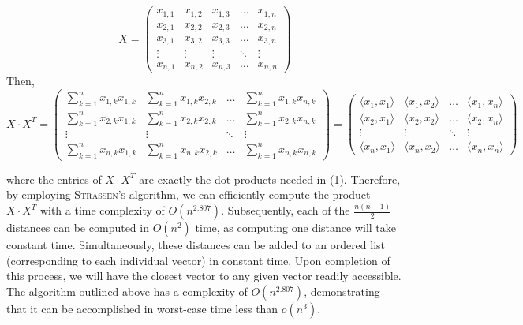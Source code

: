 \documentclass[12pt]{article}
\theoremstyle{definition}
\theoremstyle{remark}
\begin{document}
\begin{enumerate}
  $$ X = \begin{pmatrix}
    x_{1,1} & x_{1,2} & x_{1,3} & \hdots & x_{1,n} \\ 
 x_{2,1} & x_{2,2} & x_{2,3} & \hdots & x_{2,n} \\
 x_{3,1} & x_{3,2} & x_{3,3} & \hdots & x_{3,n}\\ 
    \vdots & \vdots & \vdots & \ddots & \vdots \\ 
     x_{n,1} & x_{n,2} & x_{n,3} & \hdots & x_{n,n}
  \end{pmatrix} $$
  Then, 
  $$X \cdot X^T = \begin{pmatrix}
    \sum_{k = 1}^n x_{1,k}x_{1,k} & \sum_{k = 1}^n x_{1,k}x_{2,k} & \hdots  & \sum_{k = 1}^n x_{1,k}x_{n,k} \\ 
    \sum_{k = 1}^n x_{2,k}x_{1,k} & \sum_{k = 1}^n x_{2,k}x_{2,k} & \hdots  & \sum_{k = 1}^n x_{2,k}x_{n,k} \\ 
\vdots & \vdots & \ddots & \vdots \\ 
    \sum_{k = 1}^n x_{n,k}x_{1,k} & \sum_{k = 1}^n x_{n,k}x_{2,k} & \hdots  & \sum_{k = 1}^n x_{n,k}x_{n,k}
  \end{pmatrix} = \begin{pmatrix}
    \langle x_1, x_1  \rangle &\langle x_1, x_2  \rangle & \hdots & \langle x_1, x_n  \rangle \\ 
\langle x_2, x_1  \rangle &\langle x_2, x_2  \rangle & \hdots & \langle x_2, x_n  \rangle \\ 
\vdots & \vdots & \ddots & \vdots \\ 

\langle x_n, x_1  \rangle &\langle x_n, x_2  \rangle & \hdots & \langle x_n, x_n  \rangle  

  \end{pmatrix}  $$

where the entries of $X \cdot {X^T}$ are exactly the dot products needed in (1). 
Therefore, by employing \textsc{Strassen's} algorithm, we can efficiently compute the product $X \cdot {X^T}$ with a time complexity of $O(n^{2.807})$. Subsequently, each of the $\frac{n(n-1)}{2} $ distances can be computed in $O(n^2)$ time, as computing one distance will take constant time. Simultaneously, these distances can be added to an ordered list (corresponding to each individual vector) in constant time. Upon completion of this process, we will have the closest vector to any given vector readily accessible. The algorithm outlined above has a complexity of $O(n^{2.807})$, demonstrating that it can be accomplished in worst-case time less than $o(n^3)$.


\end{enumerate}
\end{document}
